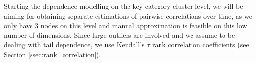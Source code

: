 
Starting the dependence modelling on the key category cluster level, we will be aiming for obtaining separate estimations of pairwise correlations over time, as we only have 3 nodes on this level and manual approximation is feasible on this low number of dimensions. Since large outliers are involved and we assume to be dealing with tail dependence, we use Kendall's $\tau$ rank correlation coefficients (see Section \ref{ssec:rank_correlation}).